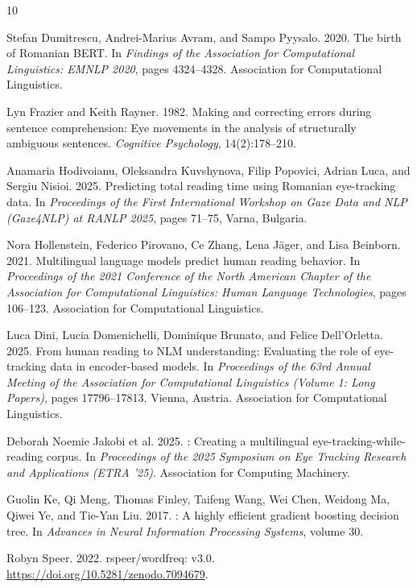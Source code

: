 \documentclass[12pt]{article}
\begin{document}
\begin{thebibliography}{10}

Stefan Dumitrescu, Andrei-Marius Avram, and Sampo Pyysalo. 2020.
\newblock The birth of {R}omanian {BERT}.
\newblock In \textit{Findings of the Association for Computational Linguistics: EMNLP 2020}, pages 4324--4328. Association for Computational Linguistics.

Lyn Frazier and Keith Rayner. 1982.
\newblock Making and correcting errors during sentence comprehension: Eye movements in the analysis of structurally ambiguous sentences.
\newblock \textit{Cognitive Psychology}, 14(2):178--210.

Anamaria Hodivoianu, Oleksandra Kuvshynova, Filip Popovici, Adrian Luca, and Sergiu Nisioi. 2025.
\newblock Predicting total reading time using {R}omanian eye-tracking data.
\newblock In \textit{Proceedings of the First International Workshop on Gaze Data and NLP (Gaze4NLP) at RANLP 2025}, pages 71--75, Varna, Bulgaria.

Nora Hollenstein, Federico Pirovano, Ce Zhang, Lena J{\"a}ger, and Lisa Beinborn. 2021.
\newblock Multilingual language models predict human reading behavior.
\newblock In \textit{Proceedings of the 2021 Conference of the North American Chapter of the Association for Computational Linguistics: Human Language Technologies}, pages 106--123. Association for Computational Linguistics.

Luca Dini, Lucia Domenichelli, Dominique Brunato, and Felice Dell'Orletta. 2025.
\newblock From human reading to {NLM} understanding: Evaluating the role of eye-tracking data in encoder-based models.
\newblock In \textit{Proceedings of the 63rd Annual Meeting of the Association for Computational Linguistics (Volume 1: Long Papers)}, pages 17796--17813, Vienna, Austria. Association for Computational Linguistics.

Deborah Noemie Jakobi et al. 2025.
: Creating a multilingual eye-tracking-while-reading corpus.
\newblock In \textit{Proceedings of the 2025 Symposium on Eye Tracking Research and Applications (ETRA '25)}. Association for Computing Machinery.

Guolin Ke, Qi Meng, Thomas Finley, Taifeng Wang, Wei Chen, Weidong Ma, Qiwei Ye, and Tie-Yan Liu. 2017.
: A highly efficient gradient boosting decision tree.
\newblock In \textit{Advances in Neural Information Processing Systems}, volume 30.

Robyn Speer. 2022.
\newblock rspeer/wordfreq: v3.0.
\newblock \url{https://doi.org/10.5281/zenodo.7094679}.

\end{thebibliography}
\end{document}
